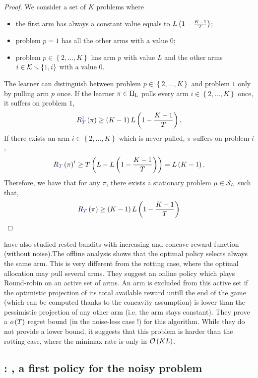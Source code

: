 \begin{proof}
We consider a set of $K$ problems where 
\begin{itemize}
\item the first arm has always a constant value equals to $L\left(1- \frac{K-1}{T}\right)$;
\item problem $p =1$ has all the other arms with a value $0$;
\item problem $p \in \left\lbrace 2, \dots, K \right\rbrace$ has arm $p$ with value $L$ and the other arms $i\in \mathcal{K} \smallsetminus \left\lbrace 1, i \right\rbrace$ with a value $0$.
\end{itemize}
The learner can distinguish between problem $p \in \left\lbrace 2, \dots, K \right\rbrace$ and problem $1$ only by pulling arm $p$ once. If the learner $\pi \in \Pi_{\rm L}$ pulls every arm $i \in \left\lbrace 2, \dots, K \right\rbrace$ once, it suffers on problem $1$,
\[\regret^1\pa{\pi} \geq \pa{K-1}L\pa{1- \frac{K-1}{T}}.\]
If there exists an arm $i \in \left\lbrace 2, \dots, K \right\rbrace$ which is never pulled, $\pi$ suffers on problem $i$,
\[\regret\pa{\pi}^i \geq T \pa{L - L\pa{1- \frac{K-1}{T}}}= L\pa{K-1}.\]
Therefore, we have that for any $\pi$, there exists a stationary problem $\mu \in \mathcal{S}_{L}$ such that,
\[\regret\pa{\pi} \geq \pa{K-1}L\pa{1- \frac{K-1}{T}}\]
\end{proof} 
\begin{remark}
\citet{heidari2016tight} have also studied rested bandits with increasing and concave reward function (without noise).The offline analysis shows that the optimal policy selects always the same arm. This is very different from the rotting case, where the optimal allocation may pull several arms. They suggest an online policy which plays Round-robin on an active set of arms. An arm is excluded from this active set if the optimistic projection of its total available reward untill the end of the game (which can be computed thanks to the concavity assumption) is lower than the pessimistic projection of any other arm (i.e. the arm stays constant). They prove a $o\left(T\right)$ regret bound (in the noise-less case !) for this algorithm. While they do not provide a lower bound, it suggests that this problem is harder than the rotting case, where the minimax rate is only in $\mathcal{O}\left(KL\right)$.
\end{remark}





\subsection{\citet{levine2017rotting} : {\wSWA}, a first policy for the noisy problem}
